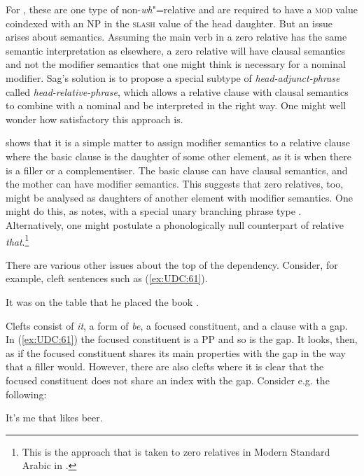 \documentclass[output=paper
	        ,collection
	        ,collectionchapter
 	        ,biblatex
                ,babelshorthands
                ,newtxmath
                ,draftmode
                ,colorlinks, citecolor=brown
]{langscibook}
\begin{document}
{\noindent
For \citet{Sag:97}, these are one type of non-\emph{wh}"=relative and are
required to have a \textsc{mod} value coindexed with an NP in the \textsc{slash} value of
the head daughter. But an issue arises about semantics. Assuming the
main verb in a zero relative has the same semantic interpretation as
elsewhere, a zero relative will have clausal semantics and not the
modifier semantics that one might think is necessary for a nominal
modifier. Sag's solution is to propose a special subtype of
\emph{head-adjunct-phrase} called \emph{head-relative-phrase}, which
allows a relative clause with clausal semantics to combine with a
nominal and be interpreted in the right way. One might well wonder how
satisfactory this approach is.

\citet[Section~5.4]{Sag:10a} shows that it is a simple matter to assign modifier semantics
to a relative clause where the basic clause is the daughter of some
other element, as it is when there is a filler or a complementiser. The
basic clause can have clausal semantics, and the mother can have modifier
semantics. This suggests that zero relatives, too, might be analysed as
daughters of another element with modifier semantics. One might do this,
as \citet[531]{Sag:10a} notes, with a special unary branching phrase
type \citep[Section~10.3.2]{Mueller99a}.
Alternatively, one might postulate a phonologically null counterpart of
relative \emph{that}.\footnote{This is the approach that is taken to
  zero relatives in Modern Standard Arabic in \citet{Alqurashi:Borsley:12}.}

There are various other issues about the top of the dependency.
Consider, for example, cleft sentences such as (\ref{ex:UDC:61}).

\begin{exe}
\ex \label{ex:UDC:61}
 It was on the table that he placed the book \trace{}.
\end{exe}

\noindent
Clefts consist of \emph{it}, a form of \emph{be}, a focused constituent,
and a clause with a gap. In (\ref{ex:UDC:61}) the focused constituent is a PP and so
is the gap. It looks, then, as if the focused constituent shares its
main properties with the gap in the way that a filler would. However,
there are also clefts where it is clear that the focused constituent
does not share an index with the gap. Consider e.g. the following:

\begin{exe}
\ex \label{ex:UDC:62}
It's me that \trace{} likes beer.
\end{exe}

}
\end{document}
